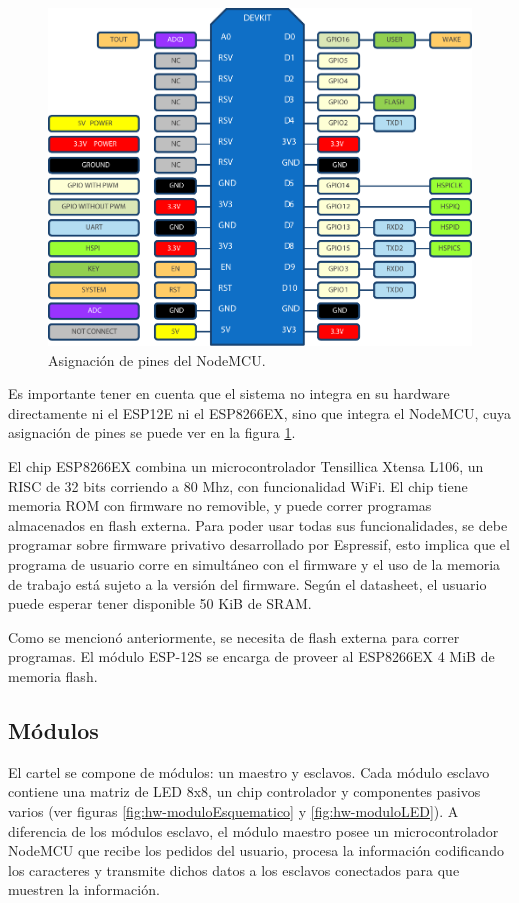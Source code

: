 \begin{figure}[ht!]
	\begin{center}
		\includegraphics[width=12cm]{imagenes/nodemcu-pinout.pdf}
		\caption{Asignación de pines del NodeMCU.}
		\label{fig:nodemcu-pinout}
	\end{center}
\end{figure}

Es importante tener en cuenta que el sistema no integra en su hardware directamente ni el ESP12E ni el ESP8266EX, sino que integra el NodeMCU, cuya asignación de pines se puede ver en la figura \ref{fig:nodemcu-pinout}.

El chip ESP8266EX combina un microcontrolador Tensillica Xtensa L106, un RISC de 32 bits corriendo a 80 Mhz, con funcionalidad WiFi. \cite{ESP8266Datasheet} El chip tiene memoria ROM con firmware no removible, y puede correr programas almacenados en flash externa. Para poder usar todas sus funcionalidades, se debe programar sobre firmware privativo desarrollado por Espressif, esto implica que el programa de usuario corre en simultáneo con el firmware y el uso de la memoria de trabajo está sujeto a la versión del firmware. Según el datasheet, el usuario puede esperar tener disponible 50 KiB de SRAM.

Como se mencionó anteriormente, se necesita de flash externa para correr programas. El módulo ESP-12S se encarga de proveer al ESP8266EX 4 MiB de memoria flash.

\subsection{Módulos}
El cartel se compone de módulos: un maestro y esclavos. Cada módulo esclavo contiene una matriz de LED 8x8, un chip controlador \cite{MAX7219} y componentes pasivos varios (ver figuras \ref{fig:hw-moduloEsquematico} y \ref{fig:hw-moduloLED}). A diferencia de los módulos esclavo, el módulo maestro posee un microcontrolador NodeMCU que recibe los pedidos del usuario, procesa la información codificando los caracteres y transmite dichos datos a los esclavos conectados para que muestren la información.

